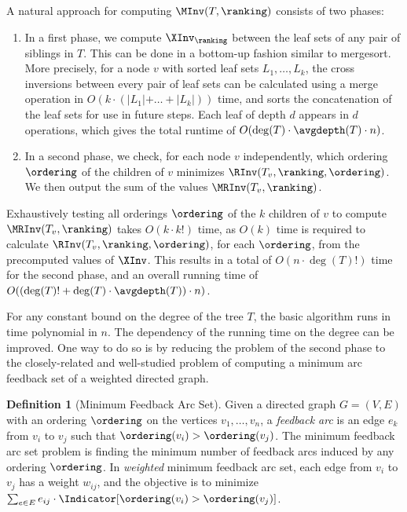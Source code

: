 \documentclass[11pt]{article}
\numberwithin{equation}{section}
\theoremstyle{definition}
\newtheorem{definition}[theorem]{Definition}
\theoremstyle{plain}
\begin{document}
A natural approach for computing $\MInv(T,\ranking)$ consists of two phases:
\begin{enumerate}
\item In a first phase, we compute $\XInv_\ranking$ between the leaf sets of any pair of siblings in $T$. This can be done in a bottom-up fashion similar to mergesort. More precisely, for a node $v$ with sorted leaf sets $L_1,\dots,L_k$, the cross inversions between every pair of leaf sets can be calculated using a merge operation in $O(k \cdot(\lvert L_1 \lvert+\dots+\lvert L_k \lvert))$ time, and sorts the concatenation of the leaf sets for use in future steps. Each leaf of depth $d$ appears in $d$ operations, which gives the total runtime of $O(\deg(T)\cdot \avgdepth(T)\cdot n)$. 
\item In a second phase, we check, for each node $v$ independently, which ordering $\ordering$ of the children of $v$ minimizes $\RInv(T_v,\ranking,\ordering)$. We then output the sum of the values $\MRInv(T_v,\ranking)$.
\end{enumerate}
Exhaustively testing all orderings $\ordering$ of the $k$ children of $v$ to compute $\MRInv(T_v,\ranking)$ takes $O(k \cdot k!)$ time, as $O(k)$ time is required to calculate $\RInv(T_v,\ranking,\ordering)$, for each $\ordering$, from the precomputed values of $\XInv$. This results in a total of $O(n \cdot \deg(T)!)$ time for the second phase, and an overall running time of $O((\deg(T)!+\deg(T)\cdot\avgdepth(T))\cdot n)$. 

For any constant bound on the degree of the tree $T$, the basic algorithm runs in time polynomial in $n$. The dependency of the running time on the degree can be improved. One way to do so is by reducing the problem of the second phase to the closely-related and well-studied problem of computing a minimum arc feedback set of a weighted directed graph.
\begin{definition}[Minimum Feedback Arc Set]
    Given a directed graph $G=(V,E)$ with an ordering $\ordering$ on the vertices $v_1,\dots,v_n$, a \emph{feedback arc} is an edge $e_k$ from $v_i$ to $v_j$ such that $\ordering(v_i)>\ordering(v_j)$. The minimum feedback arc set problem is finding the minimum number of feedback arcs induced by any ordering $\ordering$.
    In \emph{weighted} minimum feedback arc set, each edge from $v_i$ to $v_j$ has a weight $w_{ij}$, and the objective is to minimize $\sum_{e\in E} e_{ij} \cdot \Indicator[\ordering(v_i)>\ordering(v_j)]$.
\end{definition}
\end{document}
